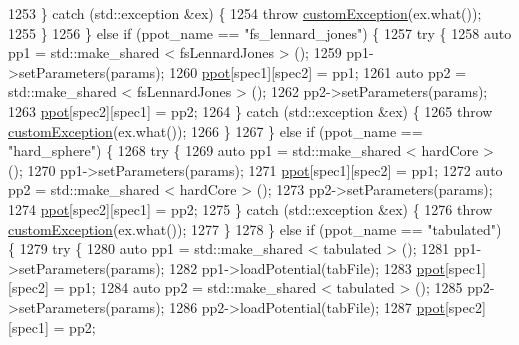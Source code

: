 \begin{DoxyCode}
1253         \} \textcolor{keywordflow}{catch} (std::exception &ex) \{
1254             \textcolor{keywordflow}{throw} \hyperlink{classcustom_exception}{customException}(ex.what());
1255         \}
1256     \} \textcolor{keywordflow}{else} \textcolor{keywordflow}{if} (ppot\_name == \textcolor{stringliteral}{"fs\_lennard\_jones"}) \{
1257         \textcolor{keywordflow}{try} \{
1258             \textcolor{keyword}{auto} pp1 = std::make\_shared < fsLennardJones > ();
1259             pp1->setParameters(params);
1260             \hyperlink{classsim_system_ad2e290b5963f132e6a3a56cee35c8e9f}{ppot}[spec1][spec2] = pp1;
1261             \textcolor{keyword}{auto} pp2 = std::make\_shared < fsLennardJones > ();
1262             pp2->setParameters(params);
1263             \hyperlink{classsim_system_ad2e290b5963f132e6a3a56cee35c8e9f}{ppot}[spec2][spec1] = pp2;
1264         \} \textcolor{keywordflow}{catch} (std::exception &ex) \{
1265             \textcolor{keywordflow}{throw} \hyperlink{classcustom_exception}{customException}(ex.what());
1266         \}
1267     \} \textcolor{keywordflow}{else} \textcolor{keywordflow}{if} (ppot\_name == \textcolor{stringliteral}{"hard\_sphere"}) \{
1268         \textcolor{keywordflow}{try} \{
1269             \textcolor{keyword}{auto} pp1 = std::make\_shared < hardCore > ();
1270             pp1->setParameters(params);
1271             \hyperlink{classsim_system_ad2e290b5963f132e6a3a56cee35c8e9f}{ppot}[spec1][spec2] = pp1;
1272             \textcolor{keyword}{auto} pp2 = std::make\_shared < hardCore > ();
1273             pp2->setParameters(params);
1274             \hyperlink{classsim_system_ad2e290b5963f132e6a3a56cee35c8e9f}{ppot}[spec2][spec1] = pp2;
1275         \} \textcolor{keywordflow}{catch} (std::exception &ex) \{
1276             \textcolor{keywordflow}{throw} \hyperlink{classcustom_exception}{customException}(ex.what());
1277         \}
1278     \} \textcolor{keywordflow}{else} \textcolor{keywordflow}{if} (ppot\_name == \textcolor{stringliteral}{"tabulated"}) \{
1279         \textcolor{keywordflow}{try} \{
1280             \textcolor{keyword}{auto} pp1 = std::make\_shared < tabulated > ();
1281             pp1->setParameters(params);
1282             pp1->loadPotential(tabFile);
1283             \hyperlink{classsim_system_ad2e290b5963f132e6a3a56cee35c8e9f}{ppot}[spec1][spec2] = pp1;
1284             \textcolor{keyword}{auto} pp2 = std::make\_shared < tabulated > ();
1285             pp2->setParameters(params);
1286             pp2->loadPotential(tabFile);
1287             \hyperlink{classsim_system_ad2e290b5963f132e6a3a56cee35c8e9f}{ppot}[spec2][spec1] = pp2;

\end{DoxyCode}
